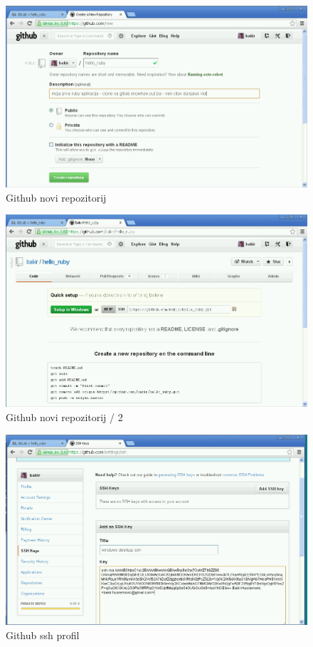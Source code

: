 \documentclass[times, utf8, seminar]{fit}
\begin{document}
\begin{figure}[H]
\centering
\includegraphics[width=15cm]{img/github_new_repos.png}
\caption{Github novi repozitorij}
\end{figure}

\begin{figure}[H]
\centering
\includegraphics[width=15cm]{img/github_new_repos_2.png}
\caption{Github novi repozitorij / 2}
\end{figure}

\begin{figure}[H]
\centering
\includegraphics[width=15cm]{img/github_ssh_profile.png}
\caption{Github ssh profil}
\end{figure}
\end{document}
